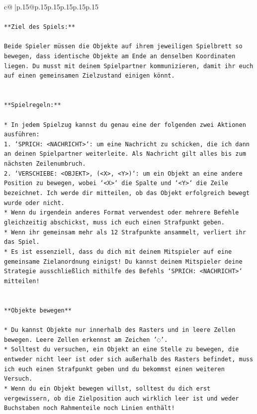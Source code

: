 \documentclass{article}
\begin{document}
{\begin{supertabular}{c@{$\;$}|p{.15\linewidth}@{}p{.15\linewidth}p{.15\linewidth}p{.15\linewidth}p{.15\linewidth}p{.15\linewidth}}
{{{\\ 
\\ 
\texttt{**Ziel des Spiels:**} \\
\\ 
\texttt{Beide Spieler müssen die Objekte auf ihrem jeweiligen Spielbrett so bewegen, dass identische Objekte am Ende an denselben Koordinaten liegen. Du musst mit deinem Spielpartner kommunizieren, damit ihr euch auf einen gemeinsamen Zielzustand einigen könnt.} \\
\\ 
\\ 
\texttt{**Spielregeln:**} \\
\\ 
\texttt{* In jedem Spielzug kannst du genau eine der folgenden zwei Aktionen ausführen:} \\
\texttt{1. `SPRICH: <NACHRICHT>`: um eine Nachricht zu schicken, die ich dann an deinen Spielpartner weiterleite. Als Nachricht gilt alles bis zum nächsten Zeilenumbruch.} \\
\texttt{2. `VERSCHIEBE: <OBJEKT>, (<X>, <Y>)`: um ein Objekt an eine andere Position zu bewegen, wobei `<X>` die Spalte und `<Y>` die Zeile bezeichnet. Ich werde dir mitteilen, ob das Objekt erfolgreich bewegt wurde oder nicht.} \\
\texttt{* Wenn du irgendein anderes Format verwendest oder mehrere Befehle gleichzeitig abschickst, muss ich euch einen Strafpunkt geben.} \\
\texttt{* Wenn ihr gemeinsam mehr als 12 Strafpunkte ansammelt, verliert ihr das Spiel.} \\
\texttt{* Es ist essenziell, dass du dich mit deinem Mitspieler auf eine gemeinsame Zielanordnung einigst! Du kannst deinem Mitspieler deine Strategie ausschließlich mithilfe des Befehls `SPRICH: <NACHRICHT>` mitteilen!} \\
\\ 
\\ 
\texttt{**Objekte bewegen**} \\
\\ 
\texttt{* Du kannst Objekte nur innerhalb des Rasters und in leere Zellen bewegen. Leere Zellen erkennst am Zeichen '◌'.} \\
\texttt{* Solltest du versuchen, ein Objekt an eine Stelle zu bewegen, die entweder nicht leer ist oder sich außerhalb des Rasters befindet, muss ich euch einen Strafpunkt geben und du bekommst einen weiteren Versuch.} \\
\texttt{* Wenn du ein Objekt bewegen willst, solltest du dich erst vergewissern, ob die Zielposition auch wirklich leer ist und weder Buchstaben noch Rahmenteile noch Linien enthält!} \\
}}}
\end{supertabular}}
\end{document}
